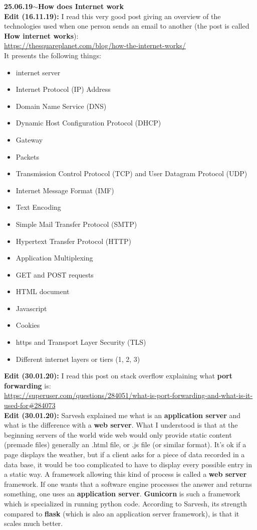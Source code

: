 \documentclass[11pt,a4paper]{article}
\newenvironment{loggentry}[2]%
{\noindent\textbf{#1}\hspace{1cm}$\mathbf{\sim}$\text{ }\textbf{#2}\\}{\vspace{0.5cm}}
\begin{document}
\begin{loggentry}{25.06.19}{How does Internet work}
\textbf{Edit (16.11.19):} I read this very good post giving an overview of the technologies used when one person sends an email to another (the post is called \textbf{How internet works}):\\
\url{https://thesquareplanet.com/blog/how-the-internet-works/}\\
It presents the following things:
\begin{itemize}
\item internet server
\item Internet Protocol (IP) Address
\item Domain Name Service (DNS)
\item Dynamic Host Configuration Protocol (DHCP)
\item Gateway
\item Packets
\item Transmission Control Protocol (TCP) and User Datagram Protocol (UDP)
\item Internet Message Format (IMF)
\item Text Encoding
\item Simple Mail Transfer Protocol (SMTP)
\item Hypertext Transfer Protocol (HTTP)
\item Application Multiplexing
\item GET and POST requests
\item HTML document
\item Javascript
\item Cookies
\item https and Transport Layer Security (TLS)
\item Different internet layers or tiers (1, 2, 3)
\end{itemize}

\textbf{Edit (30.01.20):} I read this post on stack overflow explaining what \textbf{port forwarding} is:\\
\url{https://superuser.com/questions/284051/what-is-port-forwarding-and-what-is-it-used-for#284073}\\
\textbf{Edit (30.01.20):} Sarvesh explained me what is an \textbf{application server} and what is the difference with a \textbf{web server}. What I understood is that at the beginning servers of the world wide web would only provide static content (premade files) generally an .html file, or .js file (or similar format). It's ok if a page displays the weather, but if a client asks for a piece of data recorded in a data base, it would be too complicated to have to display every possible entry in a static way. A framework allowing this kind of process is called a \textbf{web server} framework. If one wants that a software engine processes the answer and returns something, one uses an \textbf{application server}. \textbf{Gunicorn} is such a framework which is specialized in running python code. According to Sarvesh, its strength compared to \textbf{flask} (which is also an application server framework), is that it scales much better.\\


\end{loggentry}
\end{document}
